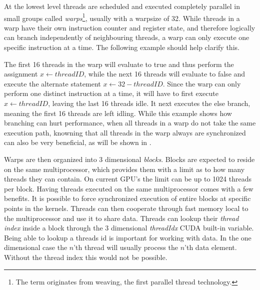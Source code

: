 
At the lowest level threads are scheduled and executed completely
parallel in small groups called \textit{warps}\footnote{The term
  originates from weaving, the first parallel thread
  technology.}, usually with a warpsize of 32. While
threads in a warp have their own instruction counter and register
state, and therefore logically can branch independently of
neighbouring threads, a warp can only execute one specific instruction
at a time. The following example should help clarify this.

\begin{algorithmic}
  \ELSE
  \ENDIF
\end{algorithmic}


The first 16 threads in the warp will evaluate to true and thus
perform the assignment $x \leftarrow threadID$, while the next 16
threads will evaluate to false and execute the alternate statement $x
\leftarrow 32 - threadID$. Since the warp can only perform one
distinct instruction at a time, it will have to first execute $x
\leftarrow threadID$, leaving the last 16 threads idle. It next
executes the else branch, meaning the first 16 threads are left
idling. While this example shows how branching can hurt performance,
when all threads in a warp do not take the same execution path,
knowning that all threads in the warp always are synchronized can also
be very beneficial, as will be shown in
.



Warps are then organized into 3 dimensional \textit{blocks}. Blocks
are expected to reside on the same multiprocessor, which provides them
with a limit as to how many threads they can contain. On current GPU's
the limit can be up to 1024 threads per block. Having threads executed
on the same multiprocessor comes with a few benefits. It is possible
to force synchronized execution of entire blocks at specific points in
the kernels. Threads can then cooperate through fast memory local to
the multiprocessor and use it to share data. Threads can lookup their
\textit{thread index} inside a block through the 3 dimensional
\textit{threadIdx} CUDA built-in variable. Being able to lookup a
threads id is important for working with data. In the one dimensional
case the $n$'th thread will usually process the $n$'th data
element. Without the thread index this would not be possible.

